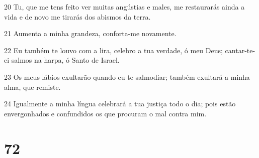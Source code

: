 \par 20 Tu, que me tens feito ver muitas angústias e males, me restaurarás ainda a vida e de novo me tirarás dos abismos da terra.
\par 21 Aumenta a minha grandeza, conforta-me novamente.
\par 22 Eu também te louvo com a lira, celebro a tua verdade, ó meu Deus; cantar-te-ei salmos na harpa, ó Santo de Israel.
\par 23 Os meus lábios exultarão quando eu te salmodiar; também exultará a minha alma, que remiste.
\par 24 Igualmente a minha língua celebrará a tua justiça todo o dia; pois estão envergonhados e confundidos os que procuram o mal contra mim.

\chapter{72}

